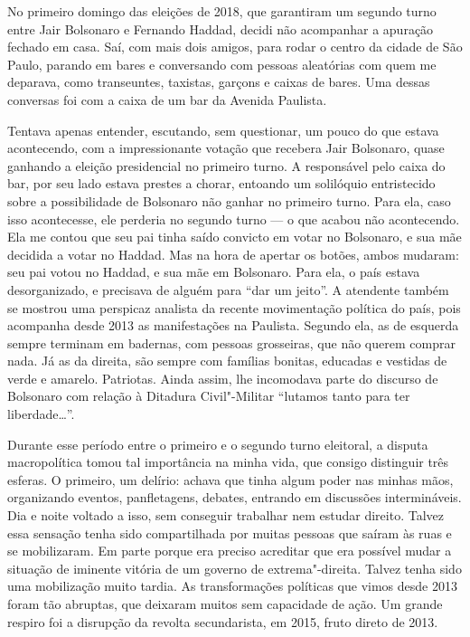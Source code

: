 No primeiro domingo das eleições de 2018, que garantiram um segundo
turno entre Jair Bolsonaro e Fernando Haddad, decidi não acompanhar a
apuração fechado em casa. Saí, com mais dois amigos, para rodar o centro
da cidade de São Paulo, parando em bares e conversando com pessoas
aleatórias com quem me deparava, como transeuntes, taxistas, garçons e
caixas de bares. Uma dessas conversas foi com a caixa de um bar da
Avenida Paulista.

Tentava apenas entender, escutando, sem questionar, um pouco do que
estava acontecendo, com a impressionante votação que recebera Jair
Bolsonaro, quase ganhando a eleição presidencial no primeiro turno. A
responsável pelo caixa do bar, por seu lado estava prestes a chorar,
entoando um solilóquio entristecido sobre a possibilidade de Bolsonaro
não ganhar no primeiro turno. Para ela, caso isso acontecesse, ele
perderia no segundo turno --- o que acabou não acontecendo. Ela me contou
que seu pai tinha saído convicto em votar no Bolsonaro, e sua mãe
decidida a votar no Haddad. Mas na hora de apertar os botões, ambos
mudaram: seu pai votou no Haddad, e sua mãe em Bolsonaro. Para ela, o
país estava desorganizado, e precisava de alguém para ``dar um jeito''.
A atendente também se mostrou uma perspicaz analista da recente
movimentação política do país, pois acompanha desde 2013 as
manifestações na Paulista. Segundo ela, as de esquerda sempre terminam
em badernas, com pessoas grosseiras, que não querem comprar nada. Já as
da direita, são sempre com famílias bonitas, educadas e vestidas de
verde e amarelo. Patriotas. Ainda assim, lhe incomodava parte do
discurso de Bolsonaro com relação à Ditadura Civil"-Militar ``lutamos tanto
para ter liberdade\ldots{}''.

Durante esse período entre o primeiro e o segundo turno eleitoral, a
disputa macropolítica tomou tal importância na minha vida, que consigo
distinguir três esferas. O primeiro, um delírio: achava que tinha algum
poder nas minhas mãos, organizando eventos, panfletagens, debates,
entrando em discussões intermináveis. Dia e noite voltado a isso, sem
conseguir trabalhar nem estudar direito. Talvez essa sensação tenha sido
compartilhada por muitas pessoas que saíram às ruas e se mobilizaram. Em
parte porque era preciso acreditar que era possível mudar a situação de
iminente vitória de um governo de extrema"-direita. Talvez tenha sido uma
mobilização muito tardia. As transformações políticas que vimos desde
2013 foram tão abruptas, que deixaram muitos sem capacidade de ação. Um
grande respiro foi a disrupção da revolta secundarista, em 2015, fruto
direto de 2013.

